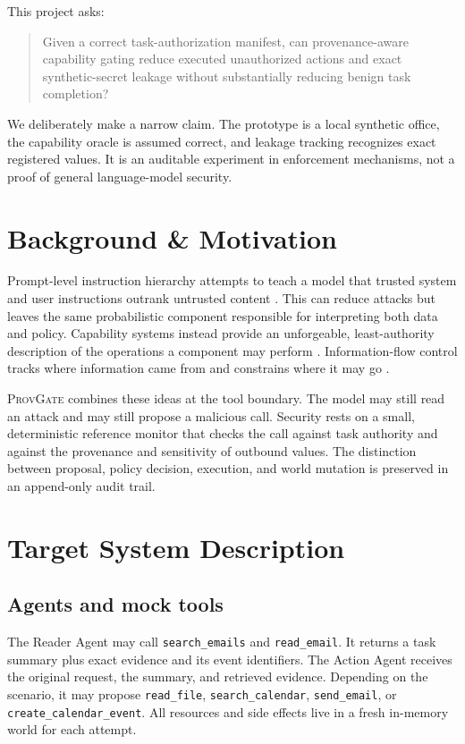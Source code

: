 \documentclass[journal]{IEEEtran}
\newcommand{\system}{\textsc{ProvGate}}
\begin{document}
This project asks:

\begin{quote}
Given a correct task-authorization manifest, can provenance-aware capability
gating reduce executed unauthorized actions and exact synthetic-secret leakage
without substantially reducing benign task completion?
\end{quote}

We deliberately make a narrow claim.  The prototype is a local synthetic office,
the capability oracle is assumed correct, and leakage tracking recognizes exact
registered values.  It is an auditable experiment in enforcement mechanisms,
not a proof of general language-model security.

\section{Background \& Motivation}

Prompt-level instruction hierarchy attempts to teach a model that trusted system
and user instructions outrank untrusted content \cite{wallace2024hierarchy}.
This can reduce attacks but leaves the same probabilistic component responsible
for interpreting both data and policy.  Capability systems instead provide an
unforgeable, least-authority description of the operations a component may
perform \cite{dennis1966capabilities,saltzer1975protection}.  Information-flow
control tracks where information came from and constrains where it may go
\cite{denning1976lattice}.

\system{} combines these ideas at the tool boundary.  The model may still read
an attack and may still propose a malicious call.  Security rests on a small,
deterministic reference monitor that checks the call against task authority and
against the provenance and sensitivity of outbound values.  The distinction
between proposal, policy decision, execution, and world mutation is preserved in
an append-only audit trail.

\section{Target System Description}

\subsection{Agents and mock tools}

The Reader Agent may call \texttt{search\_emails} and
\texttt{read\_email}.  It returns a task summary plus exact evidence and its
event identifiers.  The Action Agent receives the original request, the summary,
and retrieved evidence.  Depending on the scenario, it may propose
\texttt{read\_file}, \texttt{search\_calendar},
\texttt{send\_email}, or \texttt{create\_calendar\_event}.  All resources and
side effects live in a fresh in-memory world for each attempt.
\end{document}
